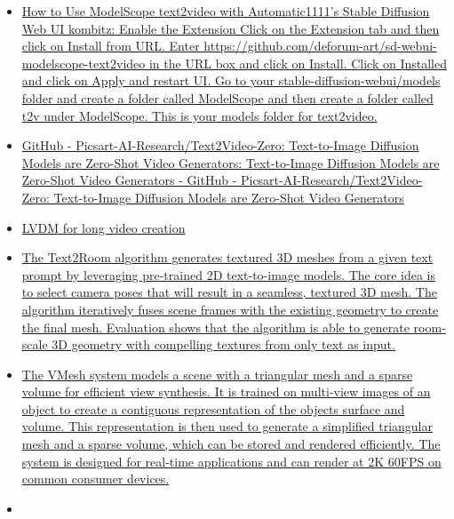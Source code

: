 \begin{itemize}
{  BEST Consistency Settings: Learn how to use AI to create animations
  from real videos. We\textquotesingle ll use Stable Diffusion and other
  tools for maximum consistency Project Files:https://bit.ly/3...}
\item
  \href{https://www.kombitz.com/2023/03/28/how-to-use-modelscope-text2video-with-automatic1111s-stable-diffusion-web-ui/}{How
  to Use ModelScope text2video with Automatic1111's Stable Diffusion Web
  UI \textbar{} kombitz: Enable the Extension Click on the Extension tab
  and then click on Install from URL. Enter
  https://github.com/deforum-art/sd-webui-modelscope-text2video in the
  URL box and click on Install. Click on Installed and click on Apply
  and restart UI. Go to your stable-diffusion-webui/models folder and
  create a folder called ModelScope and then create a folder called t2v
  under ModelScope. This is your models folder for text2video.}
\item
  \href{https://github.com/Picsart-AI-Research/Text2Video-Zero}{GitHub -
  Picsart-AI-Research/Text2Video-Zero: Text-to-Image Diffusion Models
  are Zero-Shot Video Generators: Text-to-Image Diffusion Models are
  Zero-Shot Video Generators - GitHub -
  Picsart-AI-Research/Text2Video-Zero: Text-to-Image Diffusion Models
  are Zero-Shot Video Generators}
\item
  \href{https://yingqinghe.github.io/LVDM/}{LVDM for long video
  creation}
\item
  \href{https://lukashoel.github.io/text-to-room/}{The Text2Room
  algorithm generates textured 3D meshes from a given text prompt by
  leveraging pre-trained 2D text-to-image models. The core idea is to
  select camera poses that will result in a seamless, textured 3D mesh.
  The algorithm iteratively fuses scene frames with the existing
  geometry to create the final mesh. Evaluation shows that the algorithm
  is able to generate room-scale 3D geometry with compelling textures
  from only text as input.}
\item
  \href{https://bennyguo.github.io/vmesh/}{The VMesh system models a
  scene with a triangular mesh and a sparse volume for efficient view
  synthesis. It is trained on multi-view images of an object to create a
  contiguous representation of the object\textquotesingle s surface and
  volume. This representation is then used to generate a simplified
  triangular mesh and a sparse volume, which can be stored and rendered
  efficiently. The system is designed for real-time applications and can
  render at 2K 60FPS on common consumer devices.}
\item

\end{itemize}
